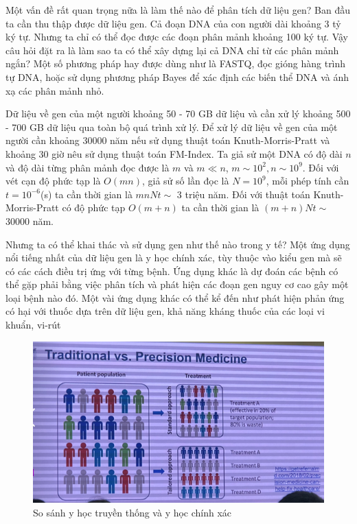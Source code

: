\documentclass[14pt, a4paper]{article}
\numberwithin{equation}{section}
\numberwithin{figure}{section}
\numberwithin{dl}{section}
\numberwithin{md}{section}
\numberwithin{bd}{section}
\numberwithin{dn}{section}
\numberwithin{hq}{section}
\begin{document}
    Một vấn đề rất quan trọng nữa là làm thế nào để phân tích dữ liệu gen? Ban đầu ta cần thu thập được dữ liệu gen.
    Cả đoạn DNA của con người dài khoảng 3 tỷ ký tự. Nhưng ta chỉ có thể đọc được các đoạn phân mảnh khoảng 100 ký tự.
    Vậy câu hỏi đặt ra là làm sao ta có thể xây dựng lại cả DNA chỉ từ các phân mảnh ngắn? Một số phương pháp hay được dùng như là FASTQ, đọc gióng hàng trình tự DNA, hoặc sử dụng phương pháp Bayes để xác định các biến thể DNA và ánh xạ các phân mảnh nhỏ.

    Dữ liệu về gen của một người khoảng 50 - 70 GB dữ liệu và cần xử lý khoảng 500 - 700 GB dữ liệu qua toàn bộ quá trình xử lý.
    Để xử lý dữ liệu về gen của một người cần khoảng 30000 năm nếu sử dụng thuật toán Knuth-Morris-Pratt và khoảng 30 giờ nêu sử dụng thuật toán FM-Index.
    Ta giả sử một DNA có độ dài $n$ và độ dài từng phân mảnh đọc được là $m$ và $m \ll n$, $m \sim 10^2, n \sim 10^9$.
    Đối với vét cạn độ phức tạp là $O(mn)$, giả sử số lần đọc là $N=10^9$, mỗi phép tính cần $t=10^{-6}$(s) ta cần thời gian là $mnNt\sim$ 3 triệu năm.
    Đối với thuật toán Knuth-Morris-Pratt có độ phức tạp $O(m+n)$ ta cần thời gian là $(m+n)Nt\sim$ 30000 năm.

    Nhưng ta có thể khai thác và sử dụng gen như thế nào trong y tế? 
    Một ứng dụng nổi tiếng nhất của dữ liệu gen là y học chính xác, tùy thuộc vào kiểu gen mà sẽ có các cách điều trị ứng với từng bệnh.
    Ứng dụng khác là dự đoán các bệnh có thể gặp phải bằng việc phân tích và phát hiện các đoạn gen nguy cơ cao gây một loại bệnh nào đó.
    Một vài ứng dụng khác có thể kể đến như phát hiện phản ứng có hại với thuốc dựa trên dữ liệu gen, khả năng kháng thuốc của các loại vi khuẩn, vi-rút 


    \begin{figure}[h!]
        \centering
        \includegraphics{Precise_Medicine.png}
        \caption{So sánh y học truyền thống và y học chính xác}
    \end{figure}
\end{document}
